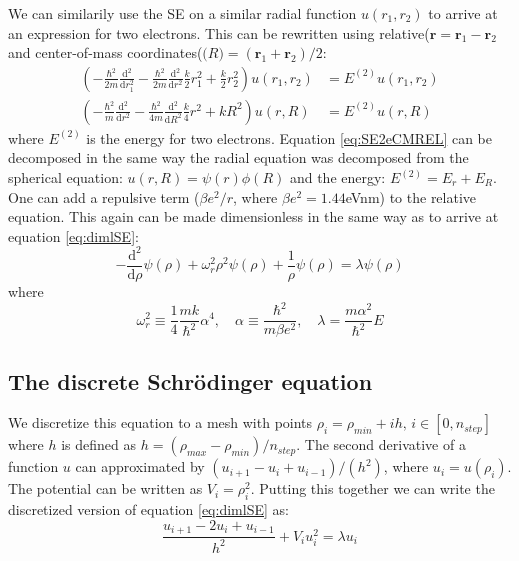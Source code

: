 \documentclass{article} %
\begin{document}
We can similarily use the SE on a similar radial function $u(r_1,r_2)$ to arrive at an expression for two electrons.
This can be rewritten using relative($\mathbf{r}=\mathbf{r}_1-\mathbf{r}_2$ and center-of-mass coordinates($\mathbf(R)=(\mathbf{r}_1+\mathbf{r}_2)/2$:
\begin{align}\label{eq:SE2e}
	\left(-\frac{\hbar^2}{2m}\frac{\mathrm{d^2}}{\mathrm{d}r_1^2} -\frac{\hbar^2}{2m}\frac{\mathrm{d^2}}{\mathrm{d}r^2}
	\frac{k}{2}r_1^2+\frac{k}{2}r_2^2\right)u(r_1,r_2)&=E^{(2)}u(r_1,r_2)\\
	\label{eq:SE2eCMREL}
	\left(-\frac{\hbar^2}{m}\frac{\mathrm{d^2}}{\mathrm{d}r^2} -\frac{\hbar^2}{4m}\frac{\mathrm{d^2}}{\mathrm{d}R^2}
	\frac{k}{4}r^2+kR^2\right)u(r,R)&=E^{(2)}u(r,R)
\end{align}
where $E^{(2)}$ is the energy for two electrons. Equation \eqref{eq:SE2eCMREL} can be decomposed in the same way the radial equation was decomposed from the spherical equation: $u(r,R)=\psi(r)\phi(R)$ and the energy: $E^{(2)}=E_r+E_R$. One can add a repulsive term ($\beta e^2/r$, where $\beta e^2=1.44$eVnm) to the relative equation. This again can be made dimensionless in the same way as to arrive at equation \eqref{eq:dimlSE}:
\begin{equation}\label{eq:dimlSE2e}
	-\frac{\mathrm{d^2}}{\mathrm{d}\rho}\psi(\rho)+\omega_r^2\rho^2\psi(\rho)+\frac{1}{\rho}\psi(\rho)
	=\lambda \psi(\rho)
\end{equation}
where 
\[
	\omega^2_r\equiv\frac{1}{4}\frac{mk}{\hbar^2}\alpha^4,\quad\alpha\equiv\frac{\hbar^2}{m\beta e^2},\quad \lambda=\frac{m\alpha^2}{\hbar^2}E
\]

\subsection{The discrete Schr\"{o}dinger equation}\label{ss:discSE}
We discretize this equation to a mesh with points $\rho_i=\rho_{min}+ih,\, i\in[0,n_{step}]$ where $h$ is defined as $h=(\rho_{max}-\rho_{min})/n_{step}$. 
The second derivative of a function $u$ can approximated by 
$({u_{i+1}-u_i+u_{i-1}})/({h^2})$, where $u_i=u(\rho_i)$. The potential can be written as $V_i=\rho_i^2$. Putting this together we can write the discretized version of equation \eqref{eq:dimlSE} as:
\begin{equation}\label{eq:dimlSEdisc}
	\frac{u_{i+1}-2u_i+u_{i-1}}{h^2} + V_iu_i^2=\lambda u_i
\end{equation}
\end{document}
